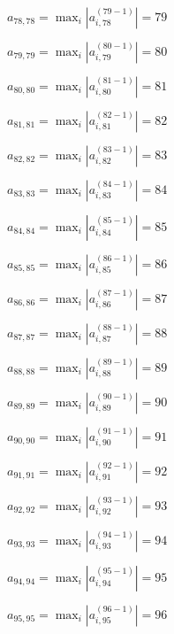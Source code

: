 \documentclass[a4paper,12pt]{article}
\begin{document}
$a _{ 78, 78 } =  \max _i |a _{ i, 78 } ^{ (79 - 1) } | = 79$

$a _{ 79, 79 } =  \max _i |a _{ i, 79 } ^{ (80 - 1) } | = 80$

$a _{ 80, 80 } =  \max _i |a _{ i, 80 } ^{ (81 - 1) } | = 81$

$a _{ 81, 81 } =  \max _i |a _{ i, 81 } ^{ (82 - 1) } | = 82$

$a _{ 82, 82 } =  \max _i |a _{ i, 82 } ^{ (83 - 1) } | = 83$

$a _{ 83, 83 } =  \max _i |a _{ i, 83 } ^{ (84 - 1) } | = 84$

$a _{ 84, 84 } =  \max _i |a _{ i, 84 } ^{ (85 - 1) } | = 85$

$a _{ 85, 85 } =  \max _i |a _{ i, 85 } ^{ (86 - 1) } | = 86$

$a _{ 86, 86 } =  \max _i |a _{ i, 86 } ^{ (87 - 1) } | = 87$

$a _{ 87, 87 } =  \max _i |a _{ i, 87 } ^{ (88 - 1) } | = 88$

$a _{ 88, 88 } =  \max _i |a _{ i, 88 } ^{ (89 - 1) } | = 89$

$a _{ 89, 89 } =  \max _i |a _{ i, 89 } ^{ (90 - 1) } | = 90$

$a _{ 90, 90 } =  \max _i |a _{ i, 90 } ^{ (91 - 1) } | = 91$

$a _{ 91, 91 } =  \max _i |a _{ i, 91 } ^{ (92 - 1) } | = 92$

$a _{ 92, 92 } =  \max _i |a _{ i, 92 } ^{ (93 - 1) } | = 93$

$a _{ 93, 93 } =  \max _i |a _{ i, 93 } ^{ (94 - 1) } | = 94$

$a _{ 94, 94 } =  \max _i |a _{ i, 94 } ^{ (95 - 1) } | = 95$

$a _{ 95, 95 } =  \max _i |a _{ i, 95 } ^{ (96 - 1) } | = 96$
\end{document}
